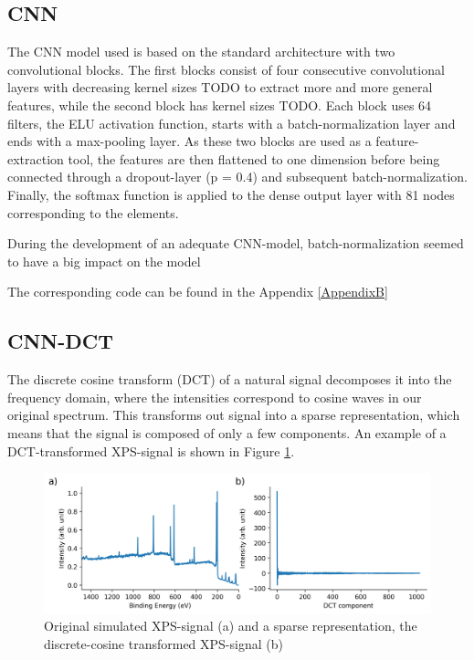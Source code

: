 \subsection{CNN}
The CNN model used is based on the standard architecture with two convolutional blocks. The first blocks consist of four consecutive convolutional layers with decreasing kernel sizes TODO to extract more and more general features, while the second block has kernel sizes TODO. Each block uses 64 filters, the ELU activation function, starts with a batch-normalization layer and ends with a max-pooling layer.
As these two blocks are used as a feature-extraction tool, the features are then flattened to one dimension before being connected through a dropout-layer (p = 0.4) and subsequent batch-normalization. Finally, the softmax function is applied to the dense output layer with 81 nodes corresponding to the elements.

During the development of an adequate CNN-model, batch-normalization seemed to have a big impact on the model 

The corresponding code can be found in the Appendix \ref{AppendixB}


\subsection{CNN-DCT}
The discrete cosine transform (DCT) of a natural signal decomposes it into the frequency domain, where the intensities correspond to cosine waves in our original spectrum. This transforms out signal into a sparse representation, which means that the signal is composed of only a few components. An example of a DCT-transformed XPS-signal is shown in Figure \ref{fig:dct}.

\begin{figure}[H]
    \centering
    \includegraphics[width=\textwidth]{Figures/dct.png}
    \caption{Original simulated XPS-signal (a) and a sparse representation, the discrete-cosine transformed XPS-signal (b)}
    \label{fig:dct}
\end{figure}

